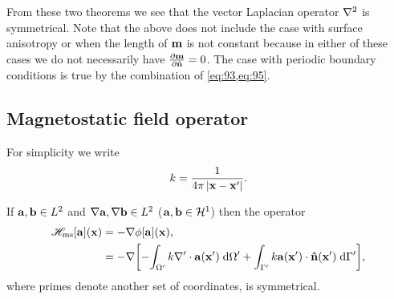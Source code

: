 From these two theorems we see that the vector Laplacian operator $\lap$ is symmetrical.
Note that the above does not include the case with surface anisotropy or when the length of $\mv$ is not constant because in either of these cases we do not necessarily have $\ddn{\mv} = 0$.
The case with periodic boundary conditions is true by the combination of \cref{eq:93,eq:95}.


\subsection{Magnetostatic field operator}

For simplicity we write
\begin{equation}
  \knl = \frac{1}{4\pi \abs{\xv - \xv'}}.
\end{equation}

\begin{theorem}
  If $\av, \bv \in \ltwo$ and $\grad \av, \grad\bv \in \ltwo$  (\ie $\av, \bv \in \sob^1$) then the operator
  \begin{equation}
    \begin{aligned}
      \hmsop [\av](\xv) &= - \grad \phim[\av](\xv), \\
      &= -\grad \bigs{
              -\intd[\magd']{ \knl \grad' \cdot \av(\xv') }
              + \intd[\boundd']{\knl \av(\xv') \cdot \nv(\xv') }
            },
    \end{aligned}
  \end{equation}
  where primes denote another set of coordinates, is symmetrical.
\end{theorem}

